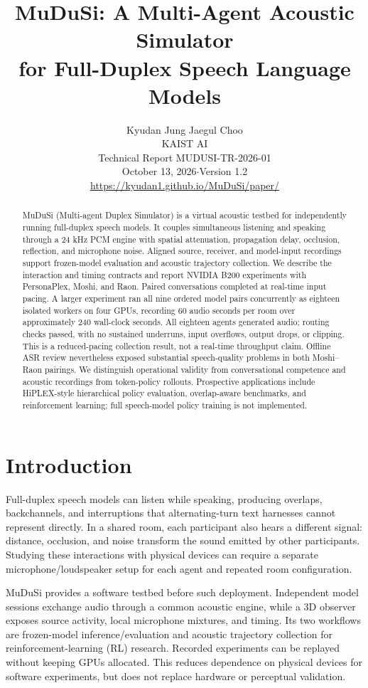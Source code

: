 \documentclass{article}
\title{MuDuSi: A Multi-Agent Acoustic Simulator\\ for Full-Duplex Speech Language Models}
\author{Kyudan Jung \qquad Jaegul Choo\\KAIST AI\\[3pt]
Technical Report MUDUSI-TR-2026-01\\October 13, 2026\quad$\cdot$\quad Version 1.2\\
\url{https://kyudan1.github.io/MuDuSi/paper/}}
\begin{document}
\maketitle
\begin{abstract}
MuDuSi (Multi-agent Duplex Simulator) is a virtual acoustic testbed for independently running full-duplex speech models. It couples simultaneous listening and speaking through a 24 kHz PCM engine with spatial attenuation, propagation delay, occlusion, reflection, and microphone noise. Aligned source, receiver, and model-input recordings support frozen-model evaluation and acoustic trajectory collection. We describe the interaction and timing contracts and report NVIDIA B200 experiments with PersonaPlex, Moshi, and Raon. Paired conversations completed at real-time input pacing. A larger experiment ran all nine ordered model pairs concurrently as eighteen isolated workers on four GPUs, recording 60 audio seconds per room over approximately 240 wall-clock seconds. All eighteen agents generated audio; routing checks passed, with no sustained underruns, input overflows, output drops, or clipping. This is a reduced-pacing collection result, not a real-time throughput claim. Offline ASR review nevertheless exposed substantial speech-quality problems in both Moshi--Raon pairings. We distinguish operational validity from conversational competence and acoustic recordings from token-policy rollouts. Prospective applications include HiPLEX-style hierarchical policy evaluation, overlap-aware benchmarks, and reinforcement learning; full speech-model policy training is not implemented.
\end{abstract}

\section{Introduction}
Full-duplex speech models can listen while speaking, producing overlaps, backchannels, and interruptions that alternating-turn text harnesses cannot represent directly. In a shared room, each participant also hears a different signal: distance, occlusion, and noise transform the sound emitted by other participants. Studying these interactions with physical devices can require a separate microphone/loudspeaker setup for each agent and repeated room configuration.

MuDuSi provides a software testbed before such deployment. Independent model sessions exchange audio through a common acoustic engine, while a 3D observer exposes source activity, local microphone mixtures, and timing. Its two workflows are frozen-model inference/evaluation and acoustic trajectory collection for reinforcement-learning (RL) research. Recorded experiments can be replayed without keeping GPUs allocated. This reduces dependence on physical devices for software experiments, but does not replace hardware or perceptual validation.
\end{document}
